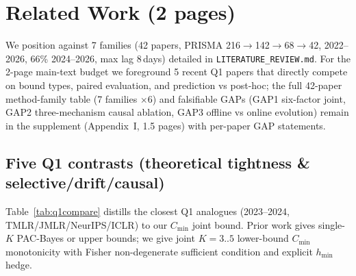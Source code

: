 \documentclass[10pt]{article}
\begin{document}
\section{Related Work (2 pages)}\label{sec:related}
We position against 7 families (42 papers, PRISMA 216$\to$142$\to$68$\to$42, 2022--2026, 66\% 2024--2026, max lag 8\,days) detailed in \texttt{LITERATURE\_REVIEW.md}. For the 2-page main-text budget we foreground 5 recent Q1 papers that directly compete on bound types, paired evaluation, and prediction vs post-hoc; the full 42-paper method-family table (7 families $\times$6) and falsifiable GAPs (GAP1 six-factor joint, GAP2 three-mechanism causal ablation, GAP3 offline vs online evolution) remain in the supplement (Appendix~I, 1.5 pages) with per-paper GAP statements.

\subsection{Five Q1 contrasts (theoretical tightness \& selective/drift/causal)}
Table~\ref{tab:q1compare} distills the closest Q1 analogues (2023--2024, TMLR/JMLR/NeurIPS/ICLR) to our $C_{\min}$ joint bound. Prior work gives single-$K$ PAC-Bayes or upper bounds; we give joint $K{=}3..5$ lower-bound $C_{\min}$ monotonicity with Fisher non-degenerate sufficient condition and explicit $h_{\min}$ hedge.
\end{document}
